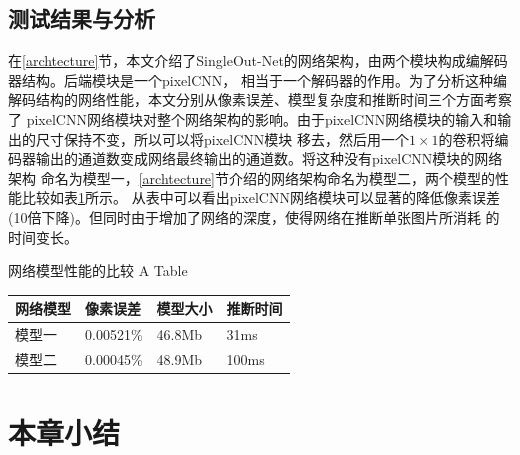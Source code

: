 \subsection{测试结果与分析}
	 在\ref{archtecture}节，本文介绍了SingleOut-Net的网络架构，由两个模块构成编解码器结构。后端模块是一个pixelCNN，
	 相当于一个解码器的作用。为了分析这种编解码结构的网络性能，本文分别从像素误差、模型复杂度和推断时间三个方面考察了
	 pixelCNN网络模块对整个网络架构的影响。由于pixelCNN网络模块的输入和输出的尺寸保持不变，所以可以将pixelCNN模块
	 移去，然后用一个$1\times1$的卷积将编码器输出的通道数变成网络最终输出的通道数。将这种没有pixelCNN模块的网络架构
	 命名为模型一，\ref{archtecture}节介绍的网络架构命名为模型二，两个模型的性能比较如表\ref{tab:performance}所示。
	 从表中可以看出pixelCNN网络模块可以显著的降低像素误差(10倍下降)。但同时由于增加了网络的深度，使得网络在推断单张图片所消耗
	 的时间变长。
\begin{table}[!hpb]
	\centering
	\bicaption
    {网络模型性能的比较}
    {A Table}
	\label{tab:performance}
	\begin{tabular}{p{70pt}p{70pt}p{70pt}p{70pt}}
	\toprule
	网络模型 & 像素误差 & 模型大小 & 推断时间 \\
	\midrule
	模型一 &  0.00521\% & 46.8Mb & 31ms \\
	模型二 & 0.00045\% & 48.9Mb & 100ms \\
	\bottomrule
\end{tabular}
\end{table}
	 
\section{本章小结}
	
	


